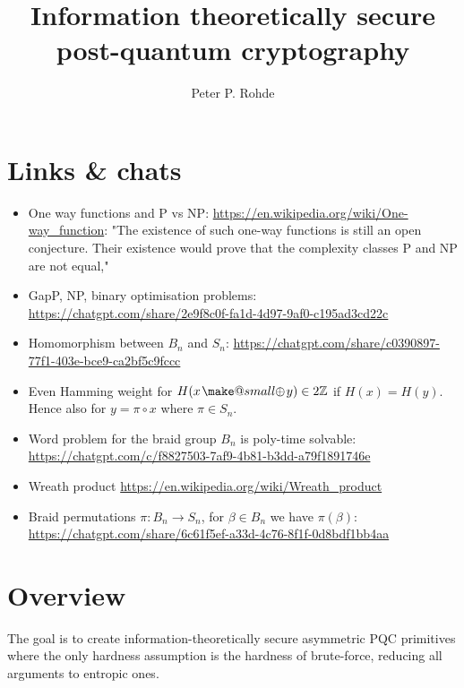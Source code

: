 \documentclass[twocolumn, aps, amsmath, amssymb, nofootinbib, superscriptaddress, longbibliography, doublefloatfix, table-of-contents, eqsecnum, rmp]{revtex4-2}
\makeatletter
\newcommand{\soplus}{{{\hspace{1pt}}{\mathbin{\mathpalette\make@small\oplus}}}{\hspace{1pt}}}
\newcommand{\make@small}[2]{%
  \vcenter{\hbox{%
    \scalebox{0.6}{$\m@th#1#2$}%
  }}%
}
\makeatother
\begin{document}
\title{Information theoretically secure post-quantum cryptography}

\author{Peter P. Rohde}

\begin{abstract}
\end{abstract}

\maketitle

\tableofcontents

\section{Links \& chats}

\begin{itemize}
	\item One way functions and P vs NP: \url{https://en.wikipedia.org/wiki/One-way_function}: "The existence of such one-way functions is still an open conjecture. Their existence would prove that the complexity classes P and NP are not equal,"
	\item GapP, NP, binary optimisation problems: \url{https://chatgpt.com/share/2e9f8c0f-fa1d-4d97-9af0-c195ad3cd22c}
	\item Homomorphism between $B_n$ and $S_n$: \url{https://chatgpt.com/share/c0390897-77f1-403e-bce9-ca2bf5c9fccc}
	\item Even Hamming weight for $H(x\soplus y)\in 2\mathbb{Z}$ if $H(x)=H(y)$. Hence also for $y=\pi\circ x$ where $\pi\in S_n$.
	\item Word problem for the braid group $B_n$ is poly-time solvable: \url{https://chatgpt.com/c/f8827503-7af9-4b81-b3dd-a79f1891746e}
	\item Wreath product \url{https://en.wikipedia.org/wiki/Wreath_product}
	\item Braid permutations \mbox{$\pi: B_n \to S_n$}, for $\beta\in B_n$ we have $\pi(\beta)$: \url{https://chatgpt.com/share/6c61f5ef-a33d-4c76-8f1f-0d8bdf1bb4aa}
\end{itemize}

\section{Overview}

The goal is to create information-theoretically secure asymmetric PQC primitives where the only hardness assumption is the hardness of brute-force, reducing all arguments to entropic ones.
\end{document}
